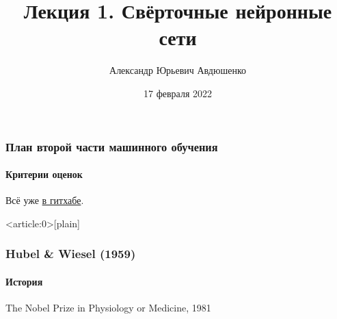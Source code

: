 \documentclass[fullscreen=true, bookmarks=true, hyperref={pdfencoding=unicode}]{beamer}
\title{Лекция 1. Свёрточные нейронные сети}
\author{Александр Юрьевич Авдюшенко}
\institute{МКН СПбГУ}
\date{17 февраля 2022}
\begin{document}

\begin{frame}
\transdissolve[duration=0.2]
\titlepage
\end{frame}

\begin{frame}
  \frametitle{План второй части машинного обучения}
  \framesubtitle{Критерии оценок}
  Всё уже \href{https://github.com/spbu-math-cs/ml-course/blob/main/2022-spring-part-2/plan_and_hws.md}{в гитхабе}.
\end{frame}


{ %
    \begin{frame}<article:0>[plain]
     \end{frame}
}


\begin{frame}
  \frametitle{Hubel \& Wiesel (1959)}
  \framesubtitle{История}
  The Nobel Prize in Physiology or Medicine, 1981
\end{frame}
\end{document}
